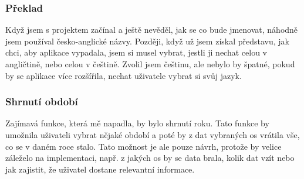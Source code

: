 \subsubsection{Překlad}
Když jsem s projektem začínal a ještě nevěděl, jak se co bude jmenovat, náhodně jsem používal  česko-anglické názvy. Později, když už jsem získal představu, jak chci, aby aplikace vypadala, jsem si musel vybrat, jestli ji nechat celou v angličtině, nebo celou v češtině. Zvolil jsem češtinu, ale nebylo by špatné, pokud by se aplikace více rozšířila, nechat uživatele vybrat si svůj jazyk.

\subsubsection{Shrnutí období}
Zajímavá funkce, která mě napadla, by bylo shrnutí roku. Tato funkce by umožnila uživateli vybrat nějaké období a poté by z dat vybraných os vrátila vše, co se v daném roce stalo. Tato možnost je ale pouze návrh, protože by velice záleželo na implementaci, např. z jakých os by se data brala, kolik dat vzít nebo jak zajistit, že uživatel dostane relevantní informace.
